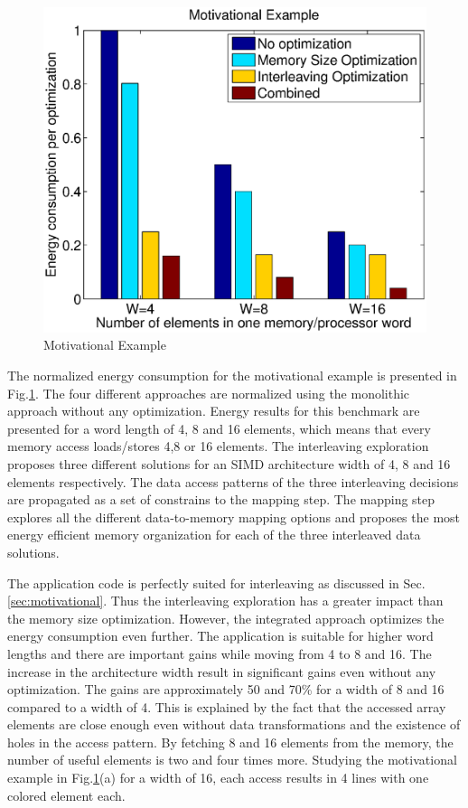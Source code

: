 \documentclass[prodmode,acmtecs]{acmsmall}
\begin{document}
\begin{figure}
\centering
	\includegraphics[scale = 0.5]{Images/Example.eps} 
	\caption{Motivational Example}
	\label{fig:example}
\end{figure}

The normalized energy consumption for the motivational example is presented in Fig.\ref{fig:example}.
The four different approaches are normalized using the monolithic approach without any optimization.
Energy results for this benchmark are presented for a word length of 4, 8 and 16 elements, which means that every memory access loads/stores 4,8 or 16 elements. 
The interleaving exploration proposes three different solutions for an SIMD architecture width of 4, 8 and 16 elements respectively.
The data access patterns of the three interleaving decisions are propagated as a set of constrains to the mapping step.
The mapping step explores all the different data-to-memory mapping options and proposes the most energy efficient memory organization for each of the three interleaved data solutions.

The application code is perfectly suited for interleaving as discussed in Sec.\ref{sec:motivational}.
Thus the interleaving exploration has a greater impact than the memory size optimization.
However, the integrated approach optimizes the energy consumption even further.
The application is suitable for higher word lengths and there are important gains while moving from 4 to 8 and 16.
The increase in the architecture width result in significant gains even without any optimization.
The gains are approximately 50 and 70\% for a width of 8 and 16 compared to a width of 4.
This is explained by the fact that the accessed array elements are close enough even without data transformations and the existence of holes in the access pattern. 
By fetching 8 and 16 elements from the memory, the number of useful elements is two and four times more.
Studying the motivational example in Fig.\ref{fig:example}(a) for a width of 16, each access results in 4 lines with one colored element each.
\end{document}
